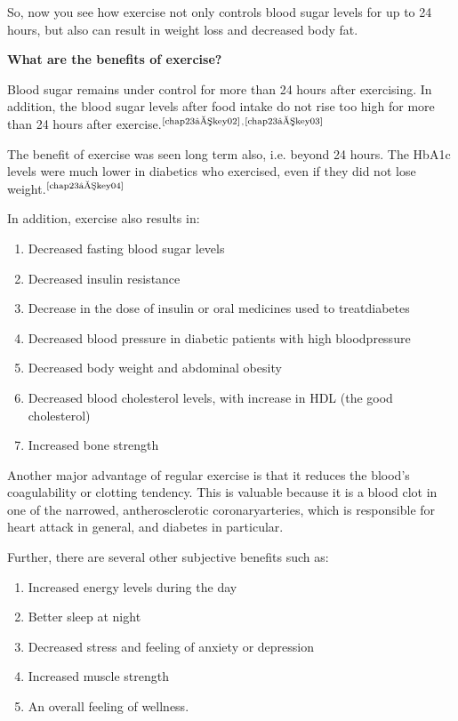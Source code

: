 So, now you see how exercise not only controls blood sugar levels for up to 24 hours, but also can result in weight loss and decreased body fat.

\noindent\textbf{What are the benefits of exercise?}

Blood sugar remains under control for more than 24 hours after exercising. In addition, the blood sugar levels after food intake do not rise too high for more than 24 hours after exercise.$^{\text{\cite{chap23–key02}}}$$^,$$^{\text{\cite{chap23–key03}}}$

The benefit of exercise was seen long term also, i.e. beyond 24 hours. The HbA1c levels were much lower in diabetics who exercised, even if they did not lose weight.$^{\text{\cite{chap23–key04}}}$

\noindent In addition, exercise also results in:

\vspace{-\topsep}
\begin{enumerate}[•]
\itemsep=0pt
\item Decreased fasting blood sugar levels
\item Decreased insulin resistance
\item Decrease in the dose of insulin or oral medicines used to treat\break diabetes
\item Decreased blood pressure in diabetic patients with high blood\break pressure
\item Decreased body weight and abdominal obesity
\item Decreased blood cholesterol levels, with increase in HDL (the good cholesterol)
\item Increased bone strength
\end{enumerate}
\vspace{-\topsep}

Another major advantage of regular exercise is that it reduces the blood’s coagulability or clotting tendency. This is valuable because it is a blood clot in one of the narrowed, antherosclerotic coronary\break arteries, which is responsible for heart attack in general, and diabetes in particular.

\noindent Further, there are several other subjective benefits such as:

\vspace{-\topsep}
\begin{enumerate}[•]
\itemsep=0pt
\item Increased energy levels during the day
\item Better sleep at night
\item Decreased stress and feeling of anxiety or depression
\item Increased muscle strength
\item An overall feeling of wellness.
\end{enumerate}
\vspace{-\topsep}

